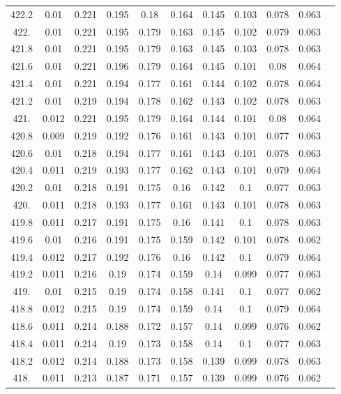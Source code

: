 \documentclass[12pt]{ctexart}
\numberwithin{equation}{section}
\begin{document}
\begin{longtable}{ccccccccccc}
422.2	&	0.01	&	0.221	&	0.195	&	0.18	&	0.164	&	0.145	&	0.103	&	0.078	&	0.063	\\
422.	&	0.01	&	0.221	&	0.195	&	0.179	&	0.163	&	0.145	&	0.102	&	0.079	&	0.063	\\
421.8	&	0.01	&	0.221	&	0.195	&	0.179	&	0.163	&	0.145	&	0.103	&	0.078	&	0.063	\\
421.6	&	0.01	&	0.221	&	0.196	&	0.179	&	0.164	&	0.145	&	0.101	&	0.08	&	0.064	\\
421.4	&	0.01	&	0.221	&	0.194	&	0.177	&	0.161	&	0.144	&	0.102	&	0.078	&	0.064	\\
421.2	&	0.01	&	0.219	&	0.194	&	0.178	&	0.162	&	0.143	&	0.102	&	0.078	&	0.063	\\
421.	&	0.012	&	0.221	&	0.195	&	0.179	&	0.164	&	0.144	&	0.101	&	0.08	&	0.064	\\
420.8	&	0.009	&	0.219	&	0.192	&	0.176	&	0.161	&	0.143	&	0.101	&	0.077	&	0.063	\\
420.6	&	0.01	&	0.218	&	0.194	&	0.177	&	0.161	&	0.143	&	0.101	&	0.078	&	0.063	\\
420.4	&	0.011	&	0.219	&	0.193	&	0.177	&	0.162	&	0.143	&	0.101	&	0.079	&	0.064	\\
420.2	&	0.01	&	0.218	&	0.191	&	0.175	&	0.16	&	0.142	&	0.1	&	0.077	&	0.063	\\
420.	&	0.011	&	0.218	&	0.193	&	0.177	&	0.161	&	0.143	&	0.101	&	0.078	&	0.063	\\
419.8	&	0.011	&	0.217	&	0.191	&	0.175	&	0.16	&	0.141	&	0.1	&	0.078	&	0.063	\\
419.6	&	0.01	&	0.216	&	0.191	&	0.175	&	0.159	&	0.142	&	0.101	&	0.078	&	0.062	\\
419.4	&	0.012	&	0.217	&	0.192	&	0.176	&	0.16	&	0.142	&	0.1	&	0.079	&	0.064	\\
419.2	&	0.011	&	0.216	&	0.19	&	0.174	&	0.159	&	0.14	&	0.099	&	0.077	&	0.063	\\
419.	&	0.01	&	0.215	&	0.19	&	0.174	&	0.158	&	0.141	&	0.1	&	0.077	&	0.062	\\
418.8	&	0.012	&	0.215	&	0.19	&	0.174	&	0.159	&	0.14	&	0.1	&	0.079	&	0.064	\\
418.6	&	0.011	&	0.214	&	0.188	&	0.172	&	0.157	&	0.14	&	0.099	&	0.076	&	0.062	\\
418.4	&	0.011	&	0.214	&	0.19	&	0.173	&	0.158	&	0.14	&	0.1	&	0.077	&	0.063	\\
418.2	&	0.012	&	0.214	&	0.188	&	0.173	&	0.158	&	0.139	&	0.099	&	0.078	&	0.063	\\
418.	&	0.011	&	0.213	&	0.187	&	0.171	&	0.157	&	0.139	&	0.099	&	0.076	&	0.062	\\

\end{longtable}
\end{document}
